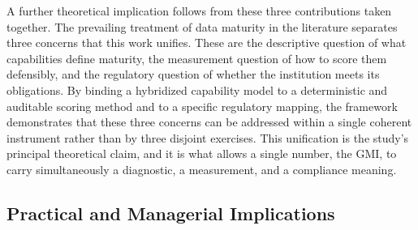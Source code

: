 A further theoretical implication follows from these three contributions taken together. The prevailing treatment of data maturity in the literature separates three concerns that this work unifies. These are the descriptive question of what capabilities define maturity, the measurement question of how to score them defensibly, and the regulatory question of whether the institution meets its obligations. By binding a hybridized capability model to a deterministic and auditable scoring method and to a specific regulatory mapping, the framework demonstrates that these three concerns can be addressed within a single coherent instrument rather than by three disjoint exercises. This unification is the study's principal theoretical claim, and it is what allows a single number, the GMI, to carry simultaneously a diagnostic, a measurement, and a compliance meaning.

\subsection{Practical and Managerial Implications}

